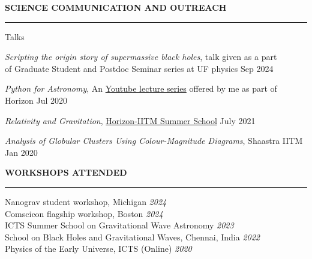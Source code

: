 \documentclass{resume} %
\renewenvironment{rSection}[1]{
\sectionskip
\textbf{\textcolor{C2}{\MakeUppercase{#1}}}
\sectionlineskip
\hrule
\begin{list}{}{
\setlength{\leftmargin}{1.5em}
}
\item[]
}{
\end{list}
}
\begin{document}
\begin{rSection}{Science communication and outreach}
    \begin{rSubsection}{Talks}{}{}{}
    \item \textit{\color{C2} Scripting the origin story of supermassive black holes}, talk given as a part \\
    of Graduate Student and Postdoc Seminar series at UF physics \hfill Sep 2024
     \item \textit{\color{C2} Python for Astronomy}, An \href{https://youtu.be/HfYR0uwYAyM}{Youtube lecture series} offered by me as part of Horizon \hfill Jul 2020
    \item \textit{\color{C2} Relativity and Gravitation}, \href{https://github.com/HorizonIITM/summer-school-2021}{Horizon-IITM Summer School} \hfill July 2021
    \item \textit{\color{C2} Analysis of Globular Clusters Using
    Colour-Magnitude Diagrams}, Shaastra IITM \hfill Jan 2020
    \end{rSubsection}
\end{rSection}


\begin{rSection}{Workshops Attended }
    {Nanograv student workshop, Michigan} \hfill {\em 2024}\\
    {Comscicon flagship workshop, Boston} \hfill {\em 2024}\\
    {ICTS Summer School on Gravitational Wave Astronomy} \hfill {\em2023}\\
    {School on Black Holes and Gravitational Waves, Chennai, India} \hfill {\em 2022}\\
    {Physics of the Early Universe, ICTS (Online)} \hfill {\em 2020}
    
\end{rSection}
\end{document}
